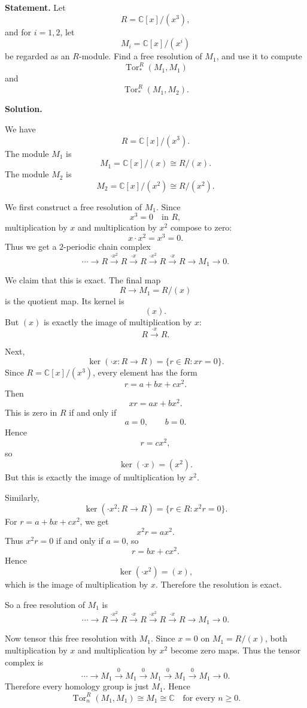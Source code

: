 \documentclass[12pt,a4paper]{article}
\theoremstyle{notespace}
\begin{document}
\textbf{Statement.}
Let
\[
R=\mathbb C[x]/(x^3),
\]
and for \(i=1,2\), let
\[
M_i=\mathbb C[x]/(x^i)
\]
be regarded as an \(R\)-module. Find a free resolution of \(M_1\), and use it to compute
\[
\operatorname{Tor}^R_*(M_1,M_1)
\]
and
\[
\operatorname{Tor}^R_*(M_1,M_2).
\]

\textbf{Solution.}

We have
\[
R=\mathbb C[x]/(x^3).
\]
The module \(M_1\) is
\[
M_1=\mathbb C[x]/(x)\cong R/(x).
\]
The module \(M_2\) is
\[
M_2=\mathbb C[x]/(x^2)\cong R/(x^2).
\]

We first construct a free resolution of \(M_1\). Since
\[
x^3=0 \quad \text{in } R,
\]
multiplication by \(x\) and multiplication by \(x^2\) compose to zero:
\[
x\cdot x^2=x^3=0.
\]
Thus we get a \(2\)-periodic chain complex
\[
\cdots
\longrightarrow
R
\xrightarrow{\cdot x^2}
R
\xrightarrow{\cdot x}
R
\xrightarrow{\cdot x^2}
R
\xrightarrow{\cdot x}
R
\longrightarrow
M_1
\longrightarrow
0.
\]

We claim that this is exact. The final map
\[
R\longrightarrow M_1=R/(x)
\]
is the quotient map. Its kernel is
\[
(x).
\]
But \((x)\) is exactly the image of multiplication by \(x\):
\[
R\xrightarrow{\cdot x} R.
\]

Next,
\[
\ker(\cdot x:R\to R)
=
\{r\in R: xr=0\}.
\]
Since \(R=\mathbb C[x]/(x^3)\), every element has the form
\[
r=a+bx+cx^2.
\]
Then
\[
xr=ax+bx^2.
\]
This is zero in \(R\) if and only if
\[
a=0,\qquad b=0.
\]
Hence
\[
r=cx^2,
\]
so
\[
\ker(\cdot x)=(x^2).
\]
But this is exactly the image of multiplication by \(x^2\).

Similarly,
\[
\ker(\cdot x^2:R\to R)
=
\{r\in R:x^2r=0\}.
\]
For \(r=a+bx+cx^2\), we get
\[
x^2r=ax^2.
\]
Thus \(x^2r=0\) if and only if \(a=0\), so
\[
r=bx+cx^2.
\]
Hence
\[
\ker(\cdot x^2)=(x),
\]
which is the image of multiplication by \(x\). Therefore the resolution is exact.

So a free resolution of \(M_1\) is
\[
\boxed{
	\cdots
	\longrightarrow
	R
	\xrightarrow{\cdot x^2}
	R
	\xrightarrow{\cdot x}
	R
	\xrightarrow{\cdot x^2}
	R
	\xrightarrow{\cdot x}
	R
	\longrightarrow
	M_1
	\longrightarrow
	0.
}
\]

Now tensor this free resolution with \(M_1\). Since \(x=0\) on \(M_1=R/(x)\), both multiplication by \(x\) and multiplication by \(x^2\) become zero maps. Thus the tensor complex is
\[
\cdots
\longrightarrow
M_1
\xrightarrow{0}
M_1
\xrightarrow{0}
M_1
\xrightarrow{0}
M_1
\xrightarrow{0}
M_1
\longrightarrow
0.
\]
Therefore every homology group is just \(M_1\). Hence
\[
\boxed{
	\operatorname{Tor}^R_n(M_1,M_1)\cong M_1
	\cong \mathbb C
	\quad \text{for every } n\geq 0.
}
\]
\end{document}
